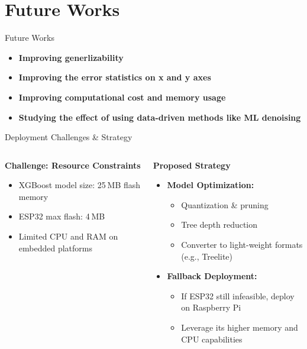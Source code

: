 \documentclass[aspectratio=169,xcolor=dvipsnames]{beamer}
\begin{document}
\section{Future Works}
\begin{frame}{Future Works}
  \begin{itemize}
    \item \textbf{Improving generlizability}
    \item \textbf{Improving the error statistics on x and y axes}
    \item \textbf{Improving computational cost and memory usage}
    \item \textbf{Studying the effect of using data-driven methods like ML denoising}
  \end{itemize}
\end{frame}

\begin{frame}{Deployment Challenges \& Strategy}
\begin{columns}[T]
  \begin{column}{0.48\textwidth}
    \begin{block}{{\textbf{Challenge: Resource Constraints}}}
      \begin{itemize}
        \item XGBoost model size: 25 MB flash memory  
        \item ESP32 max flash: 4 MB  
        \item Limited CPU and RAM on embedded platforms  
      \end{itemize}
    \end{block}
  \end{column}
  
  \begin{column}{0.48\textwidth}
    \begin{exampleblock}{{\textbf{Proposed Strategy}}}
      \begin{itemize}
        \item \textbf{Model Optimization:}  
          \begin{itemize}
            \item Quantization \& pruning  
            \item Tree depth reduction  
            \item Converter to light-weight formats (e.g., Treelite)
          \end{itemize}
        \item \textbf{Fallback Deployment:}  
          \begin{itemize}
            \item If ESP32 still infeasible, deploy on Raspberry Pi  
            \item Leverage its higher memory and CPU capabilities  
          \end{itemize}
      \end{itemize}
    \end{exampleblock}
  \end{column}
\end{columns}
\end{frame} 
\end{document}
